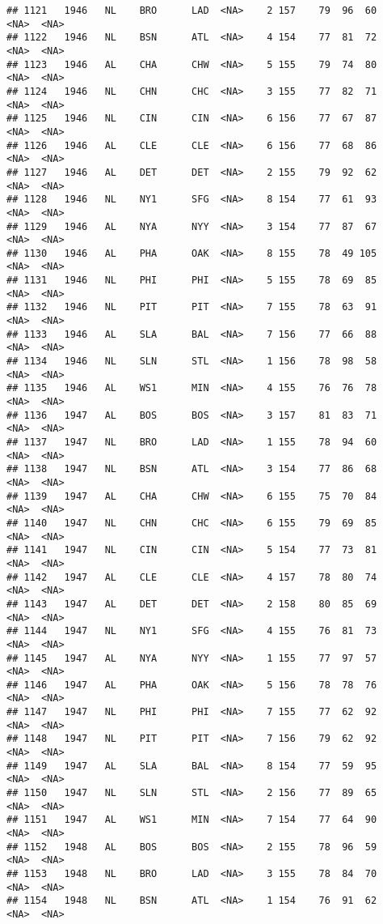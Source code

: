 \documentclass[]{article}
\begin{document}
\begin{verbatim}
## 1121   1946   NL    BRO      LAD  <NA>    2 157    79  96  60   <NA>  <NA>
## 1122   1946   NL    BSN      ATL  <NA>    4 154    77  81  72   <NA>  <NA>
## 1123   1946   AL    CHA      CHW  <NA>    5 155    79  74  80   <NA>  <NA>
## 1124   1946   NL    CHN      CHC  <NA>    3 155    77  82  71   <NA>  <NA>
## 1125   1946   NL    CIN      CIN  <NA>    6 156    77  67  87   <NA>  <NA>
## 1126   1946   AL    CLE      CLE  <NA>    6 156    77  68  86   <NA>  <NA>
## 1127   1946   AL    DET      DET  <NA>    2 155    79  92  62   <NA>  <NA>
## 1128   1946   NL    NY1      SFG  <NA>    8 154    77  61  93   <NA>  <NA>
## 1129   1946   AL    NYA      NYY  <NA>    3 154    77  87  67   <NA>  <NA>
## 1130   1946   AL    PHA      OAK  <NA>    8 155    78  49 105   <NA>  <NA>
## 1131   1946   NL    PHI      PHI  <NA>    5 155    78  69  85   <NA>  <NA>
## 1132   1946   NL    PIT      PIT  <NA>    7 155    78  63  91   <NA>  <NA>
## 1133   1946   AL    SLA      BAL  <NA>    7 156    77  66  88   <NA>  <NA>
## 1134   1946   NL    SLN      STL  <NA>    1 156    78  98  58   <NA>  <NA>
## 1135   1946   AL    WS1      MIN  <NA>    4 155    76  76  78   <NA>  <NA>
## 1136   1947   AL    BOS      BOS  <NA>    3 157    81  83  71   <NA>  <NA>
## 1137   1947   NL    BRO      LAD  <NA>    1 155    78  94  60   <NA>  <NA>
## 1138   1947   NL    BSN      ATL  <NA>    3 154    77  86  68   <NA>  <NA>
## 1139   1947   AL    CHA      CHW  <NA>    6 155    75  70  84   <NA>  <NA>
## 1140   1947   NL    CHN      CHC  <NA>    6 155    79  69  85   <NA>  <NA>
## 1141   1947   NL    CIN      CIN  <NA>    5 154    77  73  81   <NA>  <NA>
## 1142   1947   AL    CLE      CLE  <NA>    4 157    78  80  74   <NA>  <NA>
## 1143   1947   AL    DET      DET  <NA>    2 158    80  85  69   <NA>  <NA>
## 1144   1947   NL    NY1      SFG  <NA>    4 155    76  81  73   <NA>  <NA>
## 1145   1947   AL    NYA      NYY  <NA>    1 155    77  97  57   <NA>  <NA>
## 1146   1947   AL    PHA      OAK  <NA>    5 156    78  78  76   <NA>  <NA>
## 1147   1947   NL    PHI      PHI  <NA>    7 155    77  62  92   <NA>  <NA>
## 1148   1947   NL    PIT      PIT  <NA>    7 156    79  62  92   <NA>  <NA>
## 1149   1947   AL    SLA      BAL  <NA>    8 154    77  59  95   <NA>  <NA>
## 1150   1947   NL    SLN      STL  <NA>    2 156    77  89  65   <NA>  <NA>
## 1151   1947   AL    WS1      MIN  <NA>    7 154    77  64  90   <NA>  <NA>
## 1152   1948   AL    BOS      BOS  <NA>    2 155    78  96  59   <NA>  <NA>
## 1153   1948   NL    BRO      LAD  <NA>    3 155    78  84  70   <NA>  <NA>
## 1154   1948   NL    BSN      ATL  <NA>    1 154    76  91  62   <NA>  <NA>

\end{verbatim}
\end{document}
